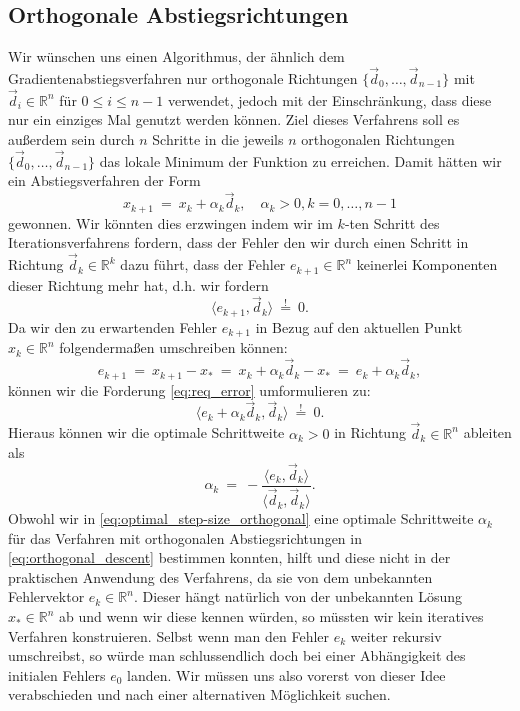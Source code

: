 \subsection{Orthogonale Abstiegsrichtungen}
\label{ss:orthogonal_descent}
Wir wünschen uns einen Algorithmus, der ähnlich dem Gradientenabstiegsverfahren nur orthogonale Richtungen $\lbrace \vec{d}_0, \ldots, \vec{d}_{n-1} \rbrace$ mit $\vec{d}_i \in \mathbb{R}^n$ für $0 \leq i \leq n-1$ verwendet, jedoch mit der Einschränkung, dass diese nur ein einziges Mal genutzt werden können.
Ziel dieses Verfahrens soll es außerdem sein durch $n$ Schritte in die jeweils $n$ orthogonalen Richtungen $\lbrace \vec{d}_0, \ldots, \vec{d}_{n-1} \rbrace$ das lokale Minimum der Funktion zu erreichen.
Damit hätten wir ein Abstiegsverfahren der Form
\begin{equation}
\label{eq:orthogonal_descent}
x_{k+1} \ = \ x_k + \alpha_k \vec{d}_k, \quad \alpha_k > 0, k = 0,\ldots,n-1
\end{equation}
gewonnen.
Wir könnten dies erzwingen indem wir im $k$-ten Schritt des Iterationsverfahrens fordern, dass der Fehler den wir durch einen Schritt in Richtung $\vec{d}_k \in \mathbb{R}^k$ dazu führt, dass der Fehler $e_{k+1} \in \mathbb{R}^n$ keinerlei Komponenten dieser Richtung mehr hat, d.h. wir fordern
\begin{equation}
\label{eq:req_error}
\langle e_{k+1}, \vec{d}_k \rangle \ \overset{!}{=} \ 0.
\end{equation}
Da wir den zu erwartenden Fehler $e_{k+1}$ in Bezug auf den aktuellen Punkt $x_k \in \mathbb{R}^n$ folgendermaßen umschreiben können:
\begin{equation*}
e_{k+1} \ = \ x_{k+1} - x_* \ = \ x_k + \alpha_k \vec{d}_k - x_* \ = \ e_k + \alpha_k \vec{d}_k,
\end{equation*}
können wir die Forderung \eqref{eq:req_error} umformulieren zu:
\begin{equation*}
\langle e_k + \alpha_k \vec{d}_k, \vec{d}_k \rangle \ \overset{!}{=} \ 0.
\end{equation*}
Hieraus können wir die optimale Schrittweite $\alpha_k > 0$ in Richtung $\vec{d}_k \in \mathbb{R}^n$ ableiten als
\begin{equation}
\label{eq:optimal_step-size_orthogonal}
\alpha_k \ = \ - \frac{\langle e_k, \vec{d}_k \rangle}{\langle \vec{d}_k, \vec{d}_k \rangle}.
\end{equation}
Obwohl wir in \eqref{eq:optimal_step-size_orthogonal} eine optimale Schrittweite $\alpha_k$ für das Verfahren mit orthogonalen Abstiegsrichtungen in \eqref{eq:orthogonal_descent} bestimmen konnten, hilft und diese nicht in der praktischen Anwendung des Verfahrens, da sie von dem unbekannten Fehlervektor $e_k \in \mathbb{R}^n$.
Dieser hängt natürlich von der unbekannten Lösung $x_* \in \mathbb{R}^n$ ab und wenn wir diese kennen würden, so müssten wir kein iteratives Verfahren konstruieren.
Selbst wenn man den Fehler $e_k$ weiter rekursiv umschreibst, so würde man schlussendlich doch bei einer Abhängigkeit des initialen Fehlers $e_0$ landen.
Wir müssen uns also vorerst von dieser Idee verabschieden und nach einer alternativen Möglichkeit suchen.

